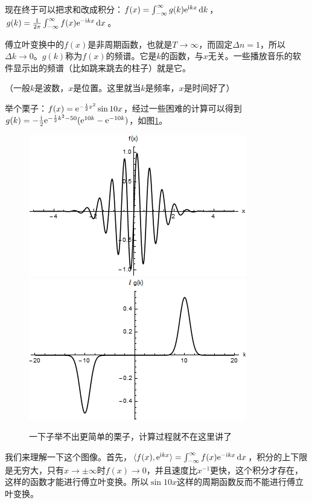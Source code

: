 现在终于可以把求和改成积分：$f(x)=\int_{-\infty}^{\infty} g(k) \mathrm{e}^{\mathrm{i} k x} \mathop{}\!\mathrm{d} k$，$g(k)=\frac{1}{2 \pi} \int_{-\infty}^{\infty} f(x) \mathrm{e}^{-\mathrm{i} k x} \mathop{}\!\mathrm{d} x$。

傅立叶变换中的$f(x)$是非周期函数，也就是$T \rightarrow \infty$，而固定$\Delta n=1$，所以$\Delta k \rightarrow 0$。$g(k)$称为$f(x)$的频谱。它是$k$的函数，与$x$无关。一些播放音乐的软件显示出的频谱（比如跳来跳去的柱子）就是它。

（一般$k$是波数，$x$是位置。这里就当$k$是频率，$x$是时间好了）

举个栗子：$f(x)=\mathrm{e}^{-\frac{1}{2} x^2} \sin 10 x$，经过一些困难的计算可以得到$g(k)=-\frac{\mathrm{i}}{2} \mathrm{e}^{-\frac{1}{2} k^2-50}(\mathrm{e}^{10 k}-\mathrm{e}^{-10 k})$，如图\ref{fig-gauss-sin10x}。
\begin{figure}[htb]
\centering
\includegraphics[scale=0.5]{fig/gauss-sin10x.png}
\includegraphics[scale=0.5]{fig/gauss-sin10x-g.png}
\caption{一下子举不出更简单的栗子，计算过程就不在这里讲了}
\label{fig-gauss-sin10x}
\end{figure}

我们来理解一下这个图像。首先，$\langle f(x),\mathrm{e}^{\mathrm{i} k x} \rangle=\int_{-\infty}^{\infty} f(x) \mathrm{e}^{-\mathrm{i} k x} \mathop{}\!\mathrm{d} x$，积分的上下限是无穷大，只有$x \rightarrow \pm \infty$时$f(x) \rightarrow 0$，并且速度比$x^{-1}$更快，这个积分才存在，这样的函数才能进行傅立叶变换。所以$\sin 10 x$这样的周期函数反而不能进行傅立叶变换。

